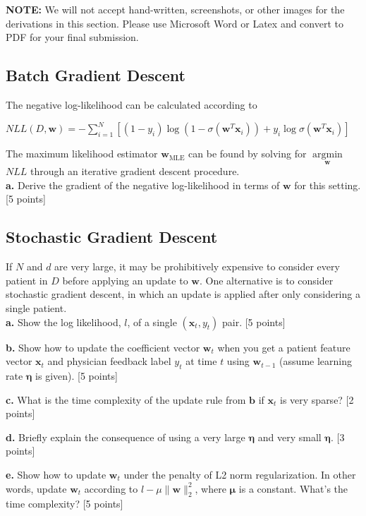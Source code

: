 \documentclass[12pt]{article}
\begin{document}
\textbf{NOTE:} We will not accept hand-written, screenshots, or other images for the derivations in this section. Please use Microsoft Word or Latex and convert to PDF for your final submission.

\subsection{Batch Gradient Descent}


The negative log-likelihood can be calculated according to
\begin{center}
$NLL\left (D, \mathbf{w} \right ) = -\sum_{i=1}^{N} \left [ \left ( 1 - y_i \right ) \log(1-\sigma(\mathbf{w}^T\mathbf{x}_i)) + y_i\log \sigma(\mathbf{w}^T\mathbf{x}_i)  \right ]$ \end{center}
The maximum likelihood estimator $\mathbf{w}_{\text{MLE}}$ can be found by solving for $\underset{\mathbf{w}}{\operatorname{arg\min}}$ $NLL$ through an iterative gradient descent procedure.\\

\textbf{a.} Derive the gradient of the negative log-likelihood in terms of $\mathbf{w}$ for this setting. [5 points] 

\subsection{Stochastic Gradient Descent}
If $N$ and $d$ are very large, it may be prohibitively expensive to consider every patient in $D$ before applying an update to $\mathbf{w}$. One alternative is to consider stochastic gradient descent, in which an update is applied after only considering a single patient. \\

\textbf{a.} Show the log likelihood, $l$, of a single $(\mathbf{x}_t, y_t)$ pair. [5 points]

\textbf{b.} Show how to update the coefficient vector $\mathbf{w}_t$ when you get a patient feature vector $\mathbf{x}_t$ and physician feedback label $y_t$ at time $t$ using $\mathbf{w}_{t-1}$ (assume learning rate $\mathbf{\eta}$ is given). [5 points]

\textbf{c.} What is the time complexity of the update rule from $\mathbf{b}$ if $\mathbf{x}_t$ is very sparse? [2 points]

\textbf{d.} Briefly explain the consequence of using a very large $\mathbf{\eta}$ and very small $\mathbf{\eta}$. [3 points]

\textbf{e.} Show how to update $\mathbf{w}_t$ under the penalty of L2 norm regularization. In other words, update $\mathbf{w}_t$ according to $l - \mu \|\mathbf{w}\|_2^2 $, where $\mathbf{\mu}$ is a constant. What's the time complexity? [5 points]
\end{document}
